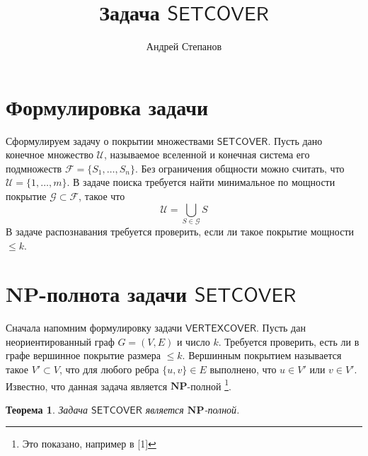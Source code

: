 \documentclass{article}
\title{Задача $\mathsf{SETCOVER}$}
\author{Андрей Степанов}
\newtheorem{theorem}{Теорема}
\begin{document}
\maketitle

\section*{Формулировка задачи}
Сформулируем задачу о покрытии множествами $\mathsf{SETCOVER}$. Пусть дано конечное множество $\mathcal{U}$, называемое вселенной и конечная система его подмножеств $\mathcal{F} = \{S_1, \ldots, S_n\}$. Без ограничения общности можно считать, что $\mathcal{U} = \{1, \ldots, m\}$. В задаче поиска требуется найти минимальное по мощности покрытие $\mathcal{G} \subset \mathcal{F}$, такое что
$$\mathcal{U} = \bigcup_{S \in \mathcal{G}} S$$
В задаче распознавания требуется проверить, если ли такое покрытие мощности $\leq k$.

\section*{NP-полнота задачи $\mathsf{SETCOVER}$}
Сначала напомним формулировку задачи $\mathsf{VERTEXCOVER}$. Пусть дан неориентированный граф $G = (V, E)$ и число $k$. Требуется проверить, есть ли в графе вершинное покрытие размера $\leq k$. Вершинным покрытием называется такое $V' \subset V$, что для любого ребра $\{u, v\} \in E$ выполнено, что  $u \in V'$ или $v \in V'$. Известно, что данная задача является $\mathbf{NP}$-полной \footnote{Это показано, например в [1]}.

\begin{theorem}
Задача $\mathsf{SETCOVER}$ является $\mathbf{NP}$-полной.
\end{theorem}
\end{document}
